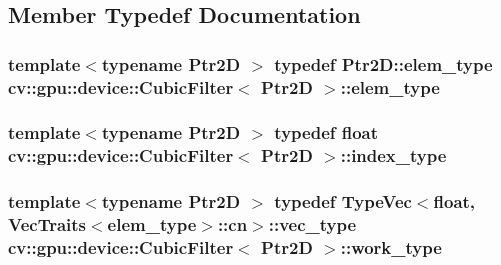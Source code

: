 \subsection{Member Typedef Documentation}
\hypertarget{structcv_1_1gpu_1_1device_1_1CubicFilter_aa110373ae66f3624d67541afc41264ef}{
\subsubsection[{elem\-\_\-type}]{\setlength{\rightskip}{0pt plus 5cm}template$<$typename Ptr2\-D $>$ typedef Ptr2\-D\-::elem\-\_\-type {\bf cv\-::gpu\-::device\-::\-Cubic\-Filter}$<$ Ptr2\-D $>$\-::{\bf elem\-\_\-type}}}\label{structcv_1_1gpu_1_1device_1_1CubicFilter_aa110373ae66f3624d67541afc41264ef}
\hypertarget{structcv_1_1gpu_1_1device_1_1CubicFilter_ad5a5d76f07537ca8cc64ec366ac691c4}{
\subsubsection[{index\-\_\-type}]{\setlength{\rightskip}{0pt plus 5cm}template$<$typename Ptr2\-D $>$ typedef float {\bf cv\-::gpu\-::device\-::\-Cubic\-Filter}$<$ Ptr2\-D $>$\-::{\bf index\-\_\-type}}}\label{structcv_1_1gpu_1_1device_1_1CubicFilter_ad5a5d76f07537ca8cc64ec366ac691c4}
\hypertarget{structcv_1_1gpu_1_1device_1_1CubicFilter_a2e4c3b9d18f4f3f2e002d8f66144e655}{
\subsubsection[{work\-\_\-type}]{\setlength{\rightskip}{0pt plus 5cm}template$<$typename Ptr2\-D $>$ typedef {\bf Type\-Vec}$<$float, {\bf Vec\-Traits}$<${\bf elem\-\_\-type}$>$\-::cn$>$\-::vec\-\_\-type {\bf cv\-::gpu\-::device\-::\-Cubic\-Filter}$<$ Ptr2\-D $>$\-::{\bf work\-\_\-type}}}\label{structcv_1_1gpu_1_1device_1_1CubicFilter_a2e4c3b9d18f4f3f2e002d8f66144e655}


